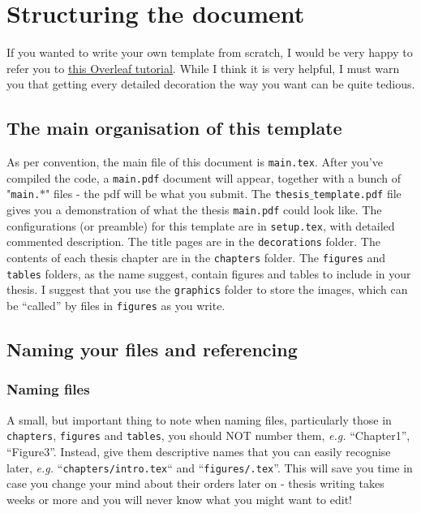 \chapter{Structuring the document}

If you wanted to write your own template from scratch, I would be very happy to refer you to \href{https://www.overleaf.com/learn/latex/How_to_Write_a_Thesis_in_LaTeX_(Part_1)\%3A_Basic_Structure}{this Overleaf tutorial}. While I think it is very helpful, I must warn you that getting every detailed decoration the way you want can be quite tedious. 

\section{The main organisation of this template}
As per convention, the main file of this document is \texttt{main.tex}. After you've compiled the code, a \texttt{main.pdf} document will appear, together with a bunch of "\texttt{main.$\ast$}" files - the pdf will be what you submit. The \texttt{thesis$\_$template.pdf} file gives you a demonstration of what the thesis \texttt{main.pdf} could look like.  The configurations (or preamble) for this template are in \texttt{setup.tex}, with detailed commented description. The title pages are in the \texttt{decorations} folder. The contents of each thesis chapter are in the \texttt{chapters} folder. The \texttt{figures} and \texttt{tables} folders, as the name suggest, contain figures and tables to include in your thesis. I suggest that you use the \texttt{graphics} folder to store the images, which can be ``called'' by files in \texttt{figures} as you write.

\section{Naming your files and referencing}

\subsection{Naming files}
A small, but important thing to note when naming files, particularly those in \texttt{chapters}, \texttt{figures} and \texttt{tables}, you should NOT number them, \textit{e.g.} ``Chapter1'', ``Figure3''. Instead, give them descriptive names that you can easily recognise later, \textit{e.g.} ``\texttt{chapters/intro.tex}`` and ``\texttt{figures/.tex}''. %
This will save you time in case you change your mind about their orders later on - thesis writing takes weeks or more and you will never know what you might want to edit!

